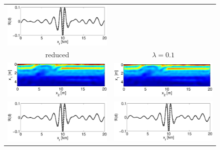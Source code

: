 \documentclass{iopart}
\begin{document}
{\begin{figure}
\begin{tabular}{cc}
\includegraphics[scale=.3]{./figs/2D_overthrust1_m}\\
{\small reduced}&
{\small $\lambda=0.1$}\\
\includegraphics[scale=.3]{./figs/2D_overthrust1_i}&
\includegraphics[scale=.3]{./figs/2D_overthrust1_j}\\
\includegraphics[scale=.3]{./figs/2D_overthrust1_n}&
\includegraphics[scale=.3]{./figs/2D_overthrust1_o}\\

\end{tabular}
\end{figure}}
\end{document}
